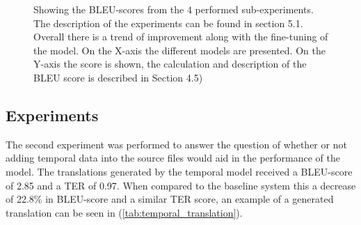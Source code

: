 \mydata

\begin{figure}[h!]
\caption{Showing the BLEU-scores from the $4$ performed sub-experiments. The description of the experiments can be found in section 5.1. Overall there is a trend of improvement along with the fine-tuning of the model.  On the X-axis the different models are presented. On the Y-axis the score is shown, the calculation and description of the BLEU score is described in Section 4.5)}

\label{fig:hyperparameter}
\end{figure}

\subsection{Experiments}

The second experiment was performed to answer the question of whether or not adding temporal data into the source files would aid in the performance of the model. The translations generated by the temporal model received a BLEU-score of 2.85 and a TER of 0.97. When compared to the baseline system this a decrease of 22.8\% in BLEU-score and a similar TER score, an example of a generated translation can be seen in (\autoref{tab:temporal_translation}). 

